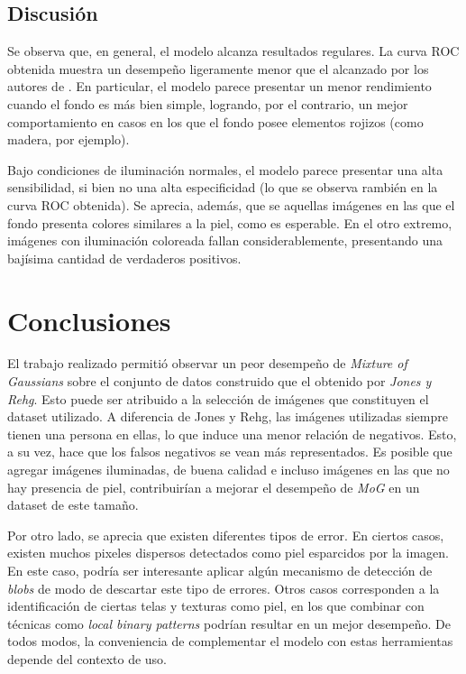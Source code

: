 \documentclass[12pt]{article}
\begin{document}
\subsection{Discusión}

Se observa que, en general, el modelo alcanza resultados regulares. La curva ROC
obtenida muestra un desempeño ligeramente menor que el alcanzado por los autores
de \cite{skin}. En particular, el modelo parece presentar un menor rendimiento
cuando el fondo es más bien simple, logrando, por el contrario, un mejor
comportamiento en casos en los que el fondo posee elementos rojizos (como
madera, por ejemplo). 

Bajo condiciones de iluminación normales, el modelo parece presentar una alta
sensibilidad, si bien no una alta especificidad (lo que se observa rambién en la
curva ROC obtenida). Se aprecia, además, que se aquellas imágenes en las que el
fondo presenta colores similares a la piel, como es esperable. En el otro
extremo, imágenes con iluminación coloreada fallan considerablemente,
presentando una bajísima cantidad de verdaderos positivos.

\section{Conclusiones}




El trabajo realizado permitió observar un peor desempeño de
\emph{Mixture of Gaussians} sobre el conjunto de datos construido que el
obtenido por \emph{Jones y Rehg}. Esto puede ser atribuido a la selección de
imágenes que constituyen el dataset utilizado. A diferencia de Jones y Rehg, las
imágenes utilizadas siempre tienen una persona en ellas, lo que induce una menor
relación de negativos. Esto, a su vez, hace que los falsos negativos se vean más
representados. Es posible que agregar imágenes iluminadas, de buena calidad e
incluso imágenes en las que no hay presencia de piel, contribuirían a mejorar el
desempeño de \emph{MoG} en un dataset de este tamaño.

Por otro lado, se aprecia que existen diferentes tipos de error. En ciertos
casos, existen muchos pixeles dispersos detectados como piel esparcidos por la
imagen. En este caso, podría ser interesante aplicar algún mecanismo de
detección de \emph{blobs} de modo de descartar este tipo de errores. Otros casos
corresponden a la identificación de ciertas telas y texturas como piel, en los
que combinar con técnicas como \emph{local binary patterns} podrían resultar en
un mejor desempeño. De todos modos, la conveniencia de complementar el modelo
con estas herramientas depende del contexto de uso.
\end{document}
